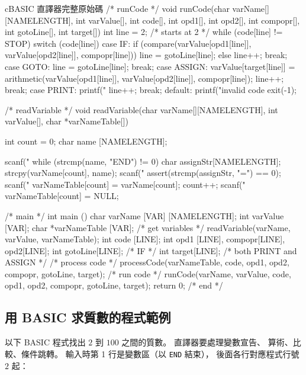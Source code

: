 \begin{code}{c}{BASIC 直譯器完整原始碼}
/* runCode */
void runCode(char varName[][NAMELENGTH],
             int varValue[], int code[],
             int opd1[], int opd2[],
             int compopr[], int gotoLine[],
             int target[])
{
  int line = 2; /* starts at 2 */
  while (code[line] != STOP) {
    switch (code[line]) {
    case IF:
      if (compare(varValue[opd1[line]],
                  varValue[opd2[line]],
                  compopr[line]))
        line = gotoLine[line];
      else
        line++;
      break;
    case GOTO:
      line = gotoLine[line];
      break;
    case ASSIGN:
      varValue[target[line]] = 
        arithmetic(varValue[opd1[line]],
                   varValue[opd2[line]],
                   compopr[line]);
      line++;
      break;
    case PRINT:
      printf("%
      line++;
      break;
    default:
      printf("invalid code %
      exit(-1);
    }
  }
}

/* readVariable */
void readVariable(char varName[][NAMELENGTH],
                  int varValue[],
                  char *varNameTable[])
{
  int count = 0;
  char name [NAMELENGTH];

  scanf("%
  while (strcmp(name, "END") != 0) {
    char assignStr[NAMELENGTH];
    strcpy(varName[count], name);
    scanf("%
    assert(strcmp(assignStr, "=") == 0);
    scanf("%
    varNameTable[count] = varName[count];
    count++;
    scanf("%
  }
  varNameTable[count] = NULL;
}

/* main */
int main ()
{
  char varName [VAR] [NAMELENGTH];
  int varValue [VAR];
  char *varNameTable [VAR];
  /* get variables */
  readVariable(varName, varValue, varNameTable);
  int code [LINE];
  int opd1 [LINE], compopr[LINE], opd2[LINE];
  int gotoLine[LINE]; /* IF */
  int target[LINE]; /* both PRINT and ASSIGN */
  /* process code */
  processCode(varNameTable, code, opd1,
              opd2, compopr, gotoLine, target);
  /* run code */
  runCode(varName, varValue, code, opd1,
          opd2, compopr, gotoLine, target);
  return 0;
}
/* end */
\end{code}

\subsection{用 BASIC 求質數的程式範例}

以下 BASIC 程式找出 $2$ 到 $100$ 之間的質數。 直譯器要處理變數宣告、
算術、比較、條件跳轉。 輸入時第 1 行是變數區（以 \texttt{END} 結束），
後面各行對應程式行號 $2$ 起：

